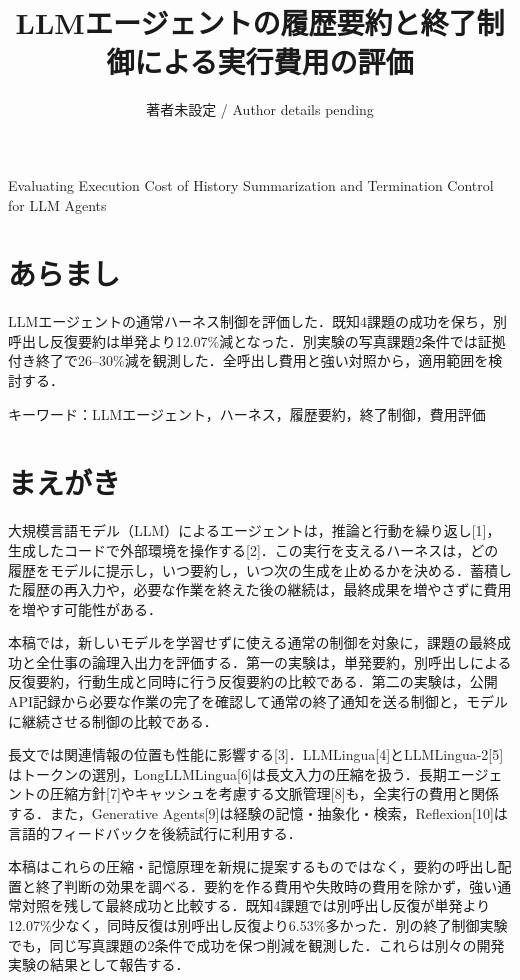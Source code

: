\documentclass{article}
\title{LLMエージェントの履歴要約と終了制御による実行費用の評価}
\author{著者未設定 / Author details pending}
\date{}
\begin{document}
\maketitle
Evaluating Execution Cost of History Summarization and Termination Control for LLM Agents

\section*{あらまし}
LLMエージェントの通常ハーネス制御を評価した．既知4課題の成功を保ち，別呼出し反復要約は単発より12.07\%減となった．別実験の写真課題2条件では証拠付き終了で26–30\%減を観測した．全呼出し費用と強い対照から，適用範囲を検討する．

\noindent キーワード：LLMエージェント，ハーネス，履歴要約，終了制御，費用評価





\section{まえがき}
大規模言語モデル（LLM）によるエージェントは，推論と行動を繰り返し[1]，生成したコードで外部環境を操作する[2]．この実行を支えるハーネスは，どの履歴をモデルに提示し，いつ要約し，いつ次の生成を止めるかを決める．蓄積した履歴の再入力や，必要な作業を終えた後の継続は，最終成果を増やさずに費用を増やす可能性がある．

本稿では，新しいモデルを学習せずに使える通常の制御を対象に，課題の最終成功と全仕事の論理入出力を評価する．第一の実験は，単発要約，別呼出しによる反復要約，行動生成と同時に行う反復要約の比較である．第二の実験は，公開API記録から必要な作業の完了を確認して通常の終了通知を送る制御と，モデルに継続させる制御の比較である．

長文では関連情報の位置も性能に影響する[3]．LLMLingua[4]とLLMLingua-2[5]はトークンの選別，LongLLMLingua[6]は長文入力の圧縮を扱う．長期エージェントの圧縮方針[7]やキャッシュを考慮する文脈管理[8]も，全実行の費用と関係する．また，Generative Agents[9]は経験の記憶・抽象化・検索，Reflexion[10]は言語的フィードバックを後続試行に利用する．

本稿はこれらの圧縮・記憶原理を新規に提案するものではなく，要約の呼出し配置と終了判断の効果を調べる．要約を作る費用や失敗時の費用を除かず，強い通常対照を残して最終成功と比較する．既知4課題では別呼出し反復が単発より12.07\%少なく，同時反復は別呼出し反復より6.53\%多かった．別の終了制御実験でも，同じ写真課題の2条件で成功を保つ削減を観測した．これらは別々の開発実験の結果として報告する．
\end{document}
